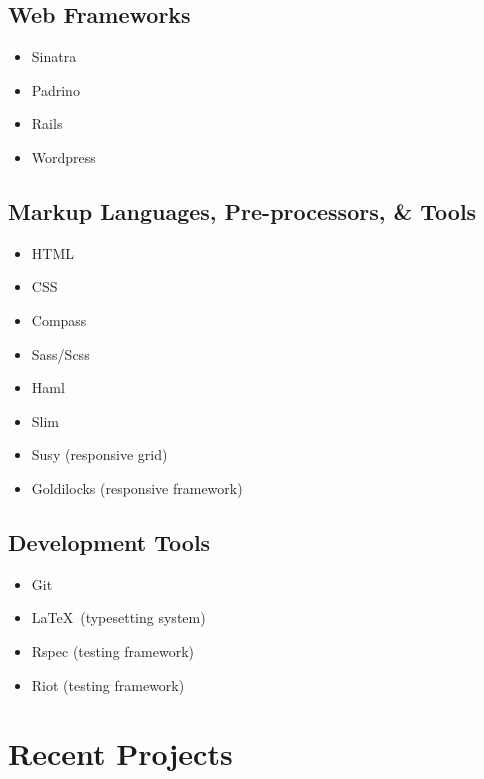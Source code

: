 \documentclass{article}
\begin{document}
\subsection{Web Frameworks} %
\label{sub:Web Frameworks}

\begin{itemize}
  \item Sinatra
  \item Padrino
  \item Rails
  \item Wordpress
\end{itemize}

\subsection{Markup Languages, Pre-processors, \& Tools} %
\label{sub:Markup Languages, Pre-processors, \& Tools}

\begin{itemize}
  \item HTML
  \item CSS
  \item Compass
  \item Sass/Scss
  \item Haml
  \item Slim
  \item Susy (responsive grid)
  \item Goldilocks (responsive framework)
\end{itemize}

\subsection{Development Tools} %
\label{sub:Development Tools}

\begin{itemize}
  \item Git
  \item \LaTeX\ (typesetting system)
  \item Rspec (testing framework)
  \item Riot (testing framework)
\end{itemize}


\section{Recent Projects} %
\label{sec:Recent Projects}
\end{document}
